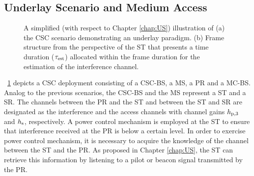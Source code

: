 \subsection{Underlay Scenario and Medium Access}
\label{scenario}

\begin{figure}
	\centering
	\caption{A simplified (with respect to Chapter \ref{chap:US}) illustration of (a) the CSC scenario demonstrating an underlay paradigm. (b) Frame structure from the perspective of the ST that presents a time duration ($\tau_{\text{est}}$) allocated within the frame duration for the estimation of the interference channel.} 
	\label{fig_HVD:scenario}
\end{figure}



\figurename~\ref{fig_HVD:scenario} depicts a CSC deployment consisting of a CSC-BS, a MS, a PR and a MC-BS. Analog to the previous scenarios, the CSC-BS and the MS represent a ST and a SR. The channels between the PR and the ST and between the ST and SR are designated as the interference and the access channels with channel gains $h_{\text{p,3}}$ and $h_{\text{s}}$, respectively. A power control mechanism is employed at the ST to ensure that interference received at the PR is below a certain level. In order to exercise power control mechanism, it is necessary to acquire the knowledge of the channel between the ST and the PR. As proposed in Chapter \ref{chap:US}, the ST can retrieve this information by listening to a pilot or beacon signal transmitted by the PR. %



